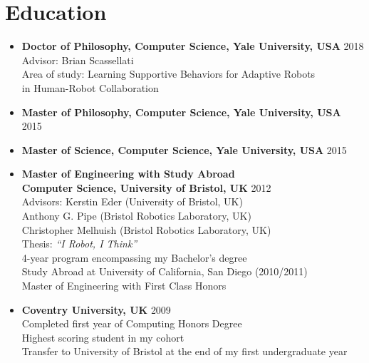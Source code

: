 \documentclass[10pt,letterpaper]{article}
\newcommand{\thing}[2]{{#1} \hfill {#2}}
\begin{document}
\section{Education}
\vspace{-0.5em}
\begin{itemize}%
\item \thing{\bf Doctor of Philosophy, Computer Science, Yale University, USA}{2018}\\
	Advisor: Brian Scassellati\\
	Area of study: Learning Supportive Behaviors for Adaptive Robots \\
	\hphantom{Area of study:} in Human-Robot Collaboration
\item \thing{\bf Master of Philosophy, Computer Science, Yale University, USA}{2015}
\item \thing{\bf Master of Science, Computer Science, Yale University, USA}{2015}
\item \thing{\bf Master of Engineering with Study Abroad\\Computer Science, University of Bristol, UK}{2012}\\
	Advisors: Kerstin Eder (University of Bristol, UK)\\
	\hphantom{Advisors:} Anthony G. Pipe (Bristol Robotics Laboratory, UK)\\
	\hphantom{Advisors:} Christopher Melhuish (Bristol Robotics Laboratory, UK)\\
	Thesis: {\it ``I Robot, I Think''}\\
	4-year program encompassing my Bachelor's degree\\
	Study Abroad at University of California, San Diego (2010/2011)\\
	Master of Engineering with First Class Honors
\item \thing{\bf Coventry University, UK}{2009}\\
	Completed first year of Computing Honors Degree\\
	Highest scoring student in my cohort\\
	Transfer to University of Bristol at the end of my first undergraduate year
\end{itemize}

\vspace{-1.8em}
\end{document}
